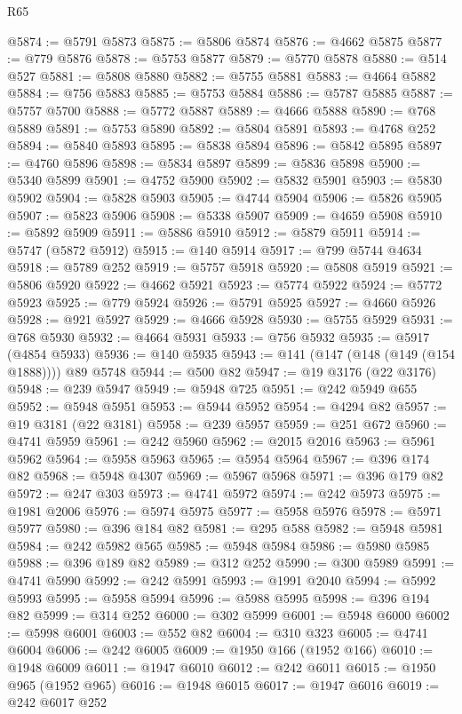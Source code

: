 \begin{lexlean}{R65}
\begin{coremodule}
{@5874 := @5791 @5873
@5875 := @5806 @5874
@5876 := @4662 @5875
@5877 := @779 @5876
@5878 := @5753 @5877
@5879 := @5770 @5878
@5880 := @514 @527
@5881 := @5808 @5880
@5882 := @5755 @5881
@5883 := @4664 @5882
@5884 := @756 @5883
@5885 := @5753 @5884
@5886 := @5787 @5885
@5887 := @5757 @5700
@5888 := @5772 @5887
@5889 := @4666 @5888
@5890 := @768 @5889
@5891 := @5753 @5890
@5892 := @5804 @5891
@5893 := @4768 @252
@5894 := @5840 @5893
@5895 := @5838 @5894
@5896 := @5842 @5895
@5897 := @4760 @5896
@5898 := @5834 @5897
@5899 := @5836 @5898
@5900 := @5340 @5899
@5901 := @4752 @5900
@5902 := @5832 @5901
@5903 := @5830 @5902
@5904 := @5828 @5903
@5905 := @4744 @5904
@5906 := @5826 @5905
@5907 := @5823 @5906
@5908 := @5338 @5907
@5909 := @4659 @5908
@5910 := @5892 @5909
@5911 := @5886 @5910
@5912 := @5879 @5911
@5914 := @5747 (@5872 @5912)
@5915 := @140 @5914
@5917 := @799 @5744 @4634
@5918 := @5789 @252
@5919 := @5757 @5918
@5920 := @5808 @5919
@5921 := @5806 @5920
@5922 := @4662 @5921
@5923 := @5774 @5922
@5924 := @5772 @5923
@5925 := @779 @5924
@5926 := @5791 @5925
@5927 := @4660 @5926
@5928 := @921 @5927
@5929 := @4666 @5928
@5930 := @5755 @5929
@5931 := @768 @5930
@5932 := @4664 @5931
@5933 := @756 @5932
@5935 := @5917 (@4854 @5933)
@5936 := @140 @5935
@5943 := @141 (@147 (@148 (@149 (@154 @1888)))) @89 @5748
@5944 := @500 @82
@5947 := @19 @3176 (@22 @3176)
@5948 := @239 @5947
@5949 := @5948 @725
@5951 := @242 @5949 @655
@5952 := @5948 @5951
@5953 := @5944 @5952
@5954 := @4294 @82
@5957 := @19 @3181 (@22 @3181)
@5958 := @239 @5957
@5959 := @251 @672
@5960 := @4741 @5959
@5961 := @242 @5960
@5962 := @2015 @2016
@5963 := @5961 @5962
@5964 := @5958 @5963
@5965 := @5954 @5964
@5967 := @396 @174 @82
@5968 := @5948 @4307
@5969 := @5967 @5968
@5971 := @396 @179 @82
@5972 := @247 @303
@5973 := @4741 @5972
@5974 := @242 @5973
@5975 := @1981 @2006
@5976 := @5974 @5975
@5977 := @5958 @5976
@5978 := @5971 @5977
@5980 := @396 @184 @82
@5981 := @295 @588
@5982 := @5948 @5981
@5984 := @242 @5982 @565
@5985 := @5948 @5984
@5986 := @5980 @5985
@5988 := @396 @189 @82
@5989 := @312 @252
@5990 := @300 @5989
@5991 := @4741 @5990
@5992 := @242 @5991
@5993 := @1991 @2040
@5994 := @5992 @5993
@5995 := @5958 @5994
@5996 := @5988 @5995
@5998 := @396 @194 @82
@5999 := @314 @252
@6000 := @302 @5999
@6001 := @5948 @6000
@6002 := @5998 @6001
@6003 := @552 @82
@6004 := @310 @323
@6005 := @4741 @6004
@6006 := @242 @6005
@6009 := @1950 @166 (@1952 @166)
@6010 := @1948 @6009
@6011 := @1947 @6010
@6012 := @242 @6011
@6015 := @1950 @965 (@1952 @965)
@6016 := @1948 @6015
@6017 := @1947 @6016
@6019 := @242 @6017 @252
}
\end{coremodule}
\end{lexlean}
